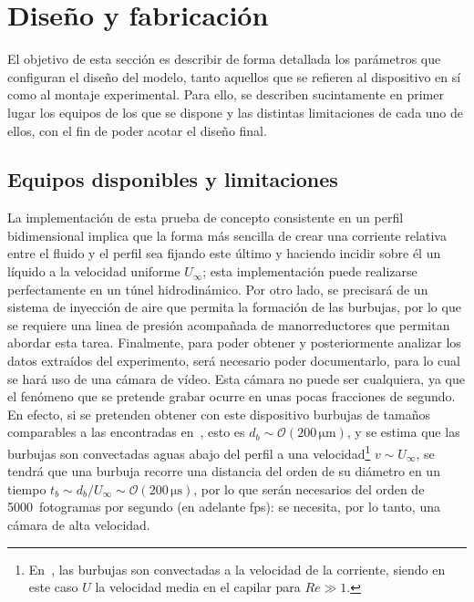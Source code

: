 \section{Diseño y fabricación}

El objetivo de esta sección es describir de forma detallada los parámetros que configuran el diseño del modelo, tanto aquellos que se refieren al dispositivo en sí como al montaje experimental. Para ello, se describen sucintamente en primer lugar los equipos de los que se dispone y las distintas limitaciones de cada uno de ellos, con el fin de poder acotar el diseño final.

\subsection{Equipos disponibles y limitaciones}

La implementación de esta prueba de concepto consistente en un perfil bidimensional implica que la forma más sencilla de crear una corriente relativa entre el fluido y el perfil sea fijando este último y haciendo incidir sobre él un líquido a la velocidad uniforme $U_{\infty}$; esta implementación puede realizarse perfectamente en un túnel hidrodinámico. Por otro lado, se precisará de un sistema de inyección de aire que permita la formación de las burbujas, por lo que se requiere una linea de presión acompañada de manorreductores que permitan abordar esta tarea. Finalmente, para poder obtener y posteriormente analizar los datos extraídos del experimento, será necesario poder documentarlo, para lo cual se hará uso de una cámara de vídeo. Esta cámara no puede ser cualquiera, ya que el fenómeno que se pretende grabar ocurre en unas pocas fracciones de segundo. En efecto, si se pretenden obtener con este dispositivo burbujas de tamaños comparables a las encontradas en~\cite{Evangelio2015b}, esto es $d_{b}\sim \mathcal{O}\left(200\,\mathrm{\mu m}\right)$, y se estima que las burbujas son convectadas aguas abajo del perfil a una velocidad\footnote{En~\cite{Evngelio2015b}, las burbujas son convectadas a la velocidad de la corriente, siendo en este caso $U$ la velocidad media en el capilar para $Re \gg 1$.} $v \sim U_{\infty}$, se tendrá que una burbuja recorre una distancia del orden de su diámetro en un tiempo $t_{b} \sim d_{b}/U_{\infty} \sim \mathcal{O}\left(200\,\mathrm{\mu s}\right)$, por lo que serán necesarios del orden de 5000~fotogramas por segundo (en adelante fps): se necesita, por lo tanto, una cámara de alta velocidad. 

